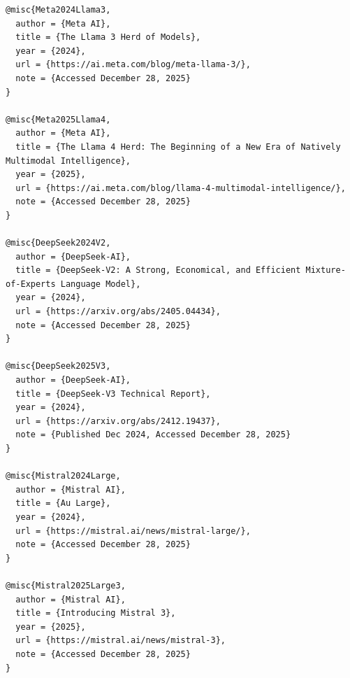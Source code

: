 \begin{verbatim}
@misc{Meta2024Llama3,
  author = {Meta AI},
  title = {The Llama 3 Herd of Models},
  year = {2024},
  url = {https://ai.meta.com/blog/meta-llama-3/},
  note = {Accessed December 28, 2025}
}

@misc{Meta2025Llama4,
  author = {Meta AI},
  title = {The Llama 4 Herd: The Beginning of a New Era of Natively Multimodal Intelligence},
  year = {2025},
  url = {https://ai.meta.com/blog/llama-4-multimodal-intelligence/},
  note = {Accessed December 28, 2025}
}

@misc{DeepSeek2024V2,
  author = {DeepSeek-AI},
  title = {DeepSeek-V2: A Strong, Economical, and Efficient Mixture-of-Experts Language Model},
  year = {2024},
  url = {https://arxiv.org/abs/2405.04434},
  note = {Accessed December 28, 2025}
}

@misc{DeepSeek2025V3,
  author = {DeepSeek-AI},
  title = {DeepSeek-V3 Technical Report},
  year = {2024},
  url = {https://arxiv.org/abs/2412.19437},
  note = {Published Dec 2024, Accessed December 28, 2025}
}

@misc{Mistral2024Large,
  author = {Mistral AI},
  title = {Au Large},
  year = {2024},
  url = {https://mistral.ai/news/mistral-large/},
  note = {Accessed December 28, 2025}
}

@misc{Mistral2025Large3,
  author = {Mistral AI},
  title = {Introducing Mistral 3},
  year = {2025},
  url = {https://mistral.ai/news/mistral-3},
  note = {Accessed December 28, 2025}
}
\end{verbatim}
